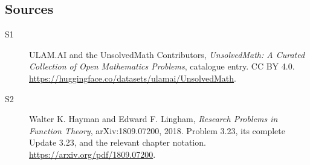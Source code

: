 \documentclass[11pt]{book}
\begin{document}
\subsection{Sources}
\begin{description}
\item[\hypertarget{source:statement:1}{S1}] ULAM.AI and the UnsolvedMath Contributors, \emph{UnsolvedMath: A Curated Collection of Open Mathematics Problems}, catalogue entry. CC BY 4.0. \url{https://huggingface.co/datasets/ulamai/UnsolvedMath}.
\item[\hypertarget{source:statement:2}{S2}] Walter K. Hayman and Edward F. Lingham, \emph{Research Problems in Function Theory}, arXiv:1809.07200, 2018. Problem 3.23, its complete Update 3.23, and the relevant chapter notation. \url{https://arxiv.org/pdf/1809.07200}.
\end{description}
\label{end:statement}
\end{document}
